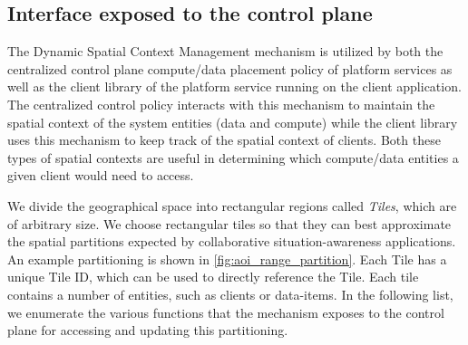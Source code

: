 \subsection{Interface exposed to the control plane}
The Dynamic Spatial Context Management mechanism is utilized by both the centralized control plane compute/data placement policy of platform services as well as the client library of the platform service running on the client application. The centralized control policy interacts with this mechanism to maintain the spatial context of the system entities (data and compute) while the client library uses this mechanism to keep track of the spatial context of clients. Both these types of spatial contexts are useful in determining which compute/data entities a given client would need to access. 
\par We divide the geographical space into rectangular regions called \textit{Tiles}, which are of arbitrary size. We choose rectangular tiles so that they can best approximate the spatial partitions expected by collaborative situation-awareness applications. An example partitioning is shown in \cref{fig:aoi_range_partition}. Each Tile has a unique Tile ID, which can be used to directly reference the Tile. Each tile contains a number of entities, such as clients or data-items. In the following list, we enumerate the various functions that the mechanism exposes to the control plane for accessing and updating this partitioning.
